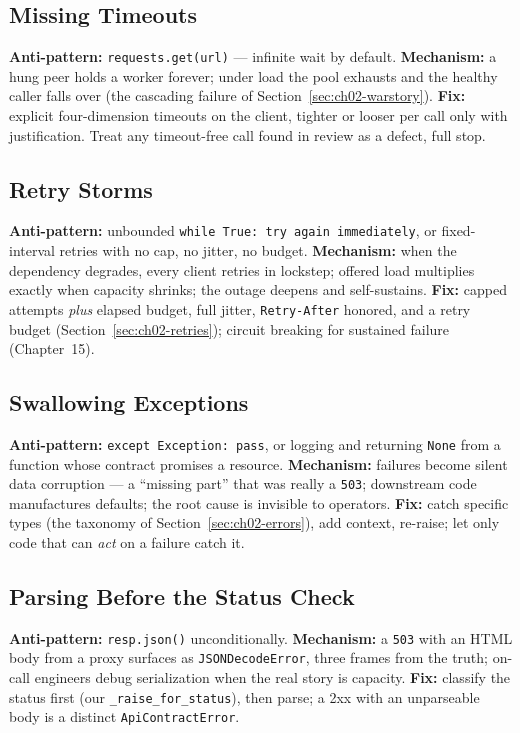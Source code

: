 \subsection{Missing Timeouts}

\textbf{Anti-pattern:} \texttt{requests.get(url)} --- infinite wait by
default. \textbf{Mechanism:} a hung peer holds a worker forever; under load
the pool exhausts and the healthy caller falls over (the cascading failure of
Section~\ref{sec:ch02-warstory}). \textbf{Fix:} explicit four-dimension
timeouts on the client, tighter or looser per call only with justification.
Treat any timeout-free call found in review as a defect, full stop.

\subsection{Retry Storms}

\textbf{Anti-pattern:} unbounded \texttt{while True: try again immediately},
or fixed-interval retries with no cap, no jitter, no budget.
\textbf{Mechanism:} when the dependency degrades, every client retries in
lockstep; offered load multiplies exactly when capacity shrinks; the outage
deepens and self-sustains. \textbf{Fix:} capped attempts \emph{plus} elapsed
budget, full jitter, \texttt{Retry-After} honored, and a retry budget
(Section~\ref{sec:ch02-retries}); circuit breaking for sustained failure
(Chapter~15).

\subsection{Swallowing Exceptions}

\textbf{Anti-pattern:} \texttt{except Exception: pass}, or logging and
returning \texttt{None} from a function whose contract promises a resource.
\textbf{Mechanism:} failures become silent data corruption --- a ``missing
part'' that was really a \texttt{503}; downstream code manufactures defaults;
the root cause is invisible to operators. \textbf{Fix:} catch specific types
(the taxonomy of Section~\ref{sec:ch02-errors}), add context, re-raise; let
only code that can \emph{act} on a failure catch it.

\subsection{Parsing Before the Status Check}

\textbf{Anti-pattern:} \texttt{resp.json()} unconditionally.
\textbf{Mechanism:} a \texttt{503} with an HTML body from a proxy surfaces as
\texttt{JSONDecodeError}, three frames from the truth; on-call engineers debug
serialization when the real story is capacity. \textbf{Fix:} classify the
status first (our \texttt{\_raise\_for\_status}), then parse; a 2xx with an
unparseable body is a distinct \texttt{ApiContractError}.

